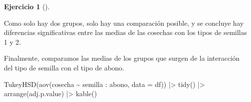 \documentclass[
  a4paper,
]{scrreport}
\newenvironment{Shaded}{\begin{snugshade}}{\end{snugshade}}
\newcommand{\AttributeTok}[1]{\textcolor[rgb]{0.40,0.45,0.13}{#1}}
\newcommand{\FunctionTok}[1]{\textcolor[rgb]{0.28,0.35,0.67}{#1}}
\newcommand{\NormalTok}[1]{\textcolor[rgb]{0.00,0.23,0.31}{#1}}
\newcommand{\SpecialCharTok}[1]{\textcolor[rgb]{0.37,0.37,0.37}{#1}}
\theoremstyle{definition}
\newtheorem{exercise}{Ejercicio}[chapter]
\theoremstyle{remark}
\begin{document}
\begin{exercise}[]
\begin{enumerate}
\begin{tcolorbox}
  Como solo hay dos grupos, solo hay una comparación posible, y se
  concluye hay diferencias significativas entre las medias de las
  cosechas con los tipos de semillas 1 y 2.

  Finalmente, comparamos las medias de los grupos que surgen de la
  interacción del tipo de semilla con el tipo de abono.

\begin{Shaded}
\begin{Highlighting}[]
\FunctionTok{TukeyHSD}\NormalTok{(}\FunctionTok{aov}\NormalTok{(cosecha }\SpecialCharTok{\textasciitilde{}}\NormalTok{ semilla }\SpecialCharTok{:}\NormalTok{ abono, }\AttributeTok{data =}\NormalTok{ df)) }\SpecialCharTok{|\textgreater{}} 
    \FunctionTok{tidy}\NormalTok{() }\SpecialCharTok{|\textgreater{}} 
    \FunctionTok{arrange}\NormalTok{(adj.p.value) }\SpecialCharTok{|\textgreater{}} 
    \FunctionTok{kable}\NormalTok{()}
\end{Highlighting}
\end{Shaded}


\end{tcolorbox}
\end{enumerate}
\end{exercise}
\end{document}

